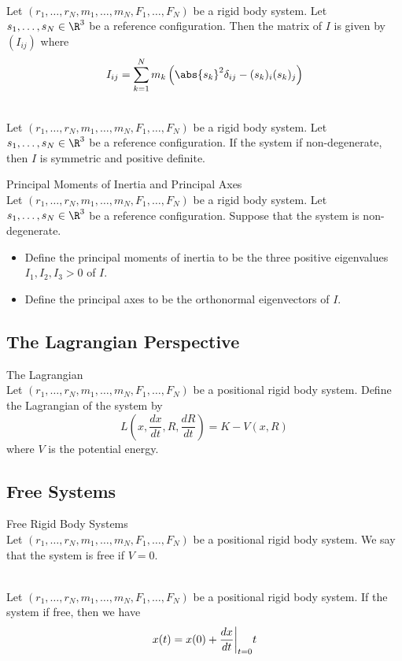 \documentclass[a4paper]{article}
\begin{document}
\begin{prp}{}{}\\
Let $(r_1,\dots,r_N,m_1,\dots,m_N,F_1,\dots,F_N)$ be a rigid body system. Let $s_1,\dots,s_N\in\R^3$ be a reference configuration. Then the matrix of $I$ is given by $(I_{ij})$ where $$I_{ij}=\sum_{k=1}^Nm_k\left(\abs{s_k}^2\delta_{ij}-(s_k)_i(s_k)_j\right)$$
\end{prp}

\begin{prp}{}{}\\
Let $(r_1,\dots,r_N,m_1,\dots,m_N,F_1,\dots,F_N)$ be a rigid body system. Let $s_1,\dots,s_N\in\R^3$ be a reference configuration. If the system if non-degenerate, then $I$ is symmetric and positive definite. 
\end{prp}

\begin{defn}{Principal Moments of Inertia and Principal Axes}{}\\
Let $(r_1,\dots,r_N,m_1,\dots,m_N,F_1,\dots,F_N)$ be a rigid body system. Let $s_1,\dots,s_N\in\R^3$ be a reference configuration. Suppose that the system is non-degenerate. 
\begin{itemize}
\item Define the principal moments of inertia to be the three positive eigenvalues $I_1,I_2,I_3>0$ of $I$. 
\item Define the principal axes to be the orthonormal eigenvectors of $I$. 
\end{itemize}
\end{defn}

\subsection{The Lagrangian Perspective}
\begin{defn}{The Lagrangian}{}\\
Let $(r_1,\dots,r_N,m_1,\dots,m_N,F_1,\dots,F_N)$ be a positional rigid body system. Define the Lagrangian of the system by $$L\left(x,\frac{dx}{dt},R,\frac{dR}{dt}\right)=K-V(x,R)$$ where $V$ is the potential energy. 
\end{defn}


\subsection{Free Systems}
\begin{defn}{Free Rigid Body Systems}{}\\
Let $(r_1,\dots,r_N,m_1,\dots,m_N,F_1,\dots,F_N)$ be a positional rigid body system. We say that the system is free if $V=0$. 
\end{defn}

\begin{prp}{}{}\\
Let $(r_1,\dots,r_N,m_1,\dots,m_N,F_1,\dots,F_N)$ be a positional rigid body system. If the system if free, then we have $$x(t)=x(0)+\frac{dx}{dt}\bigg{|}_{t=0}t$$
\end{prp}
\end{document}
